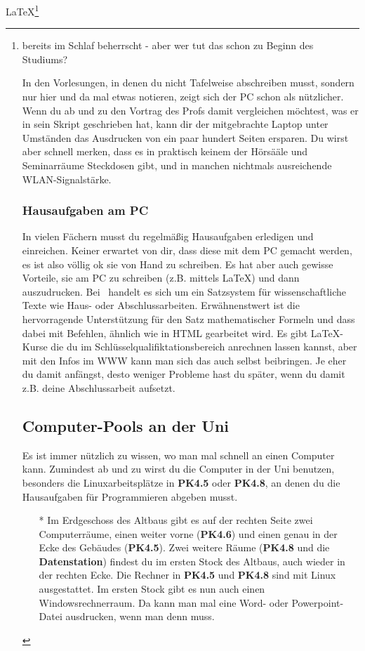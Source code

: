 			\LaTeX\footnote{ bereits im Schlaf beherrscht - aber wer tut das schon zu Beginn des Studiums?

			In den Vorlesungen, in denen du nicht Tafelweise abschreiben musst, sondern nur hier und da mal etwas notieren, zeigt sich der PC schon als nützlicher. Wenn du ab und zu den Vortrag des Profs damit vergleichen möchtest, was er in sein Skript geschrieben hat, kann dir der mitgebrachte Laptop unter Umständen das Ausdrucken von ein paar hundert Seiten ersparen. Du wirst aber schnell merken, dass es in praktisch keinem der Hörsääle und Seminarräume Steckdosen gibt, und in manchen nichtmals ausreichende WLAN-Signalstärke.

		\subsubsection{Hausaufgaben am PC}
			In vielen Fächern musst du regelmäßig
			Hausaufgaben erledigen und einreichen. Keiner
			erwartet von dir, dass diese mit dem PC gemacht
			werden, es ist also völlig ok sie von Hand zu
			schreiben. Es hat aber auch gewisse Vorteile,
			sie am PC zu schreiben (z.B. mittels \LaTeX) und
			dann auszudrucken. Bei \LateX\ handelt es sich
			um ein Satzsystem für wissenschaftliche
			Texte wie Haus- oder Abschlussarbeiten.
			Erwähnenstwert ist die hervorragende
			Unterstützung für den Satz mathematischer
			Formeln und dass dabei mit Befehlen, ähnlich wie
			in HTML gearbeitet wird. Es gibt \LaTeX-Kurse die du im Schlüsselqualifiktationsbereich anrechnen lassen kannst, aber mit den Infos im WWW kann man sich das auch selbst beibringen. Je eher du damit anfängst, desto weniger Probleme hast du später, wenn du damit z.B. deine Abschlussarbeit aufsetzt.

		\subsection{Computer-Pools an der Uni}
			Es ist immer nützlich zu wissen, wo man mal schnell an einen Computer kann. Zumindest ab und zu wirst du die Computer in der Uni benutzen, besonders die Linuxarbeitsplätze in \textbf{PK4.5} oder \textbf{PK4.8}, an denen du die Hausaufgaben für Programmieren abgeben musst.

			\begin{itemize}
				\item[*] Im Erdgeschoss des Altbaus gibt es auf der rechten Seite zwei Computerräume, einen weiter vorne (\textbf{PK4.6}) und einen genau in der Ecke des Gebäudes (\textbf{PK4.5}). Zwei weitere Räume (\textbf{PK4.8} und die \textbf{Datenstation}) findest du im ersten Stock des Altbaus, auch wieder in der rechten Ecke. Die Rechner in \textbf{PK4.5} und \textbf{PK4.8} sind mit Linux ausgestattet. Im ersten Stock gibt es nun auch einen Windowsrechnerraum. Da kann man mal eine Word- oder Powerpoint-Datei ausdrucken, wenn man denn muss.


\end{itemize}}

